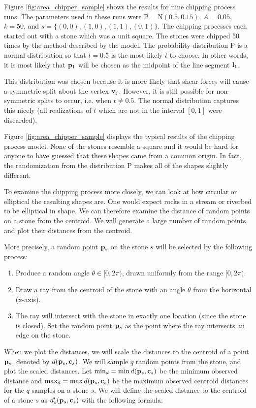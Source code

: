 Figure \ref{fig:area_chipper_sample} shows the results for nine chipping process runs. The parameters used in these runs were $\mathrm{P} = \mathrm{N}(0.5, 0.15)$, $A = 0.05$, $k = 50$, and $s = \{(0,0), (1,0), (1,1), (0,1)\}$. The chipping processes each started out with a stone which was a unit square. The stones were chipped 50 times by the method described by the model. The probability distribution $\mathrm{P}$ is a normal distribution so that $t = 0.5$ is the most likely $t$ to choose. In other words, it is most likely that $\mathbf{p}_1$ will be chosen as the midpoint of the line segment $\mathbf{l}_1$.

This distribution was chosen because it is more likely that shear forces will cause a symmetric split about the vertex $\mathbf{v}_j$. However, it is still possible for non-symmetric splits to occur, i.e. when $t \neq 0.5$. The normal distribution captures this nicely (all realizations of $t$ which are not in the interval $[0,1]$ were discarded).

Figure \ref{fig:area_chipper_sample} displays the typical results of the chipping process model. None of the stones resemble a square and it would be hard for anyone to have guessed that these shapes came from a common origin. In fact, the randomization from the distribution $\mathrm{P}$ makes all of the shapes slightly different.

To examine the chipping process more closely, we can look at how circular or elliptical the resulting shapes are. One would expect rocks in a stream or riverbed to be elliptical in shape. We can therefore examine the distance of random points on a stone from the centroid. We will generate a large number of random points, and plot their distances from the centroid.

More precisely, a random point $\mathbf{p}_s$ on the stone $s$ will be selected by the following process:
\begin{enumerate}
  \item Produce a random angle $\theta \in [0, 2\pi)$, drawn uniformly from the range $[0, 2\pi)$.
  \item Draw a ray from the centroid of the stone with an angle $\theta$ from the horizontal (x-axis).
  \item The ray will intersect with the stone in exactly one location (since the stone is closed). Set the random point $\mathbf{p}_s$ as the point where the ray intersects an edge on the stone.
\end{enumerate}

When we plot the distances, we will scale the distances to the centroid of a point $\mathbf{p}_s$, denoted by $d(\mathbf{p}_s, \mathbf{c}_s)$. We will sample $q$ random points from the stone, and plot the scaled distances. Let $\min_d = \min d(\mathbf{p}_s, \mathbf{c}_s)$ be the minimum observed distance and $\max_d = \max d(\mathbf{p}_s, \mathbf{c}_s)$ be the maximum observed centroid distances for the $q$ samples on a stone $s$. We will define the scaled distance to the centroid of a stone $s$ as $d'_s(\mathbf{p}_s, \mathbf{c}_s)$ with the following formula:

